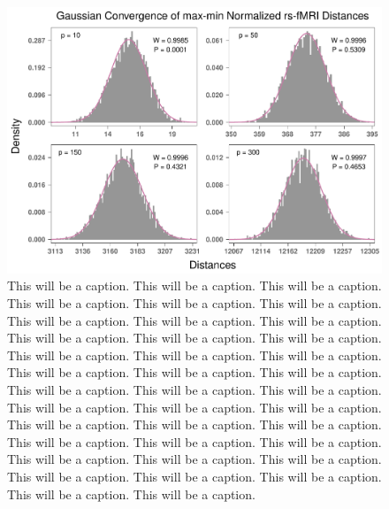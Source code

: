 \documentclass[10pt,letterpaper]{article}\usepackage[]{graphicx}\usepackage[]{color}
\begin{document}
\begin{figure}[H]
	\includegraphics[width=\textwidth]{central_limit_hist_rs-fMRI_max-min.pdf}
	\caption{This will be a caption. This will be a caption. This will be a caption. This will be a caption. This will be a caption. This will be a caption. This will be a caption. This will be a caption. This will be a caption. This will be a caption. This will be a caption. This will be a caption. This will be a caption. This will be a caption. This will be a caption. This will be a caption. This will be a caption. This will be a caption. This will be a caption. This will be a caption. This will be a caption. This will be a caption. This will be a caption. This will be a caption. This will be a caption. This will be a caption. This will be a caption. This will be a caption. This will be a caption. This will be a caption. This will be a caption. This will be a caption. This will be a caption. This will be a caption. This will be a caption. This will be a caption. This will be a caption. This will be a caption.}
\end{figure}

\end{document}
